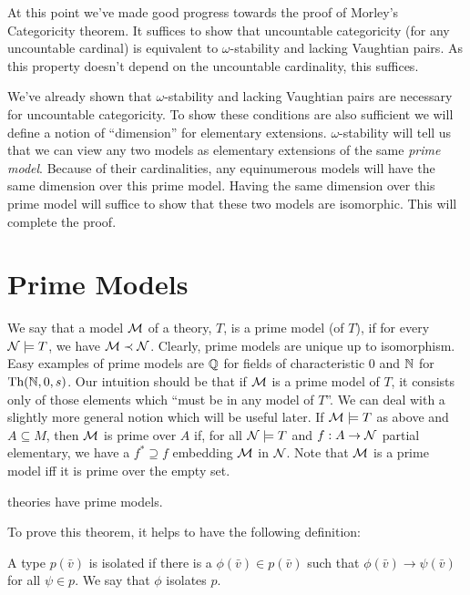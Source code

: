 At this point we've made good progress towards the proof of Morley's Categoricity theorem.
It suffices to show that uncountable categoricity (for any uncountable cardinal) is equivalent to \(\omega\)-stability and lacking Vaughtian pairs.
As this property doesn't depend on the uncountable cardinality, this suffices. 

We've already shown that \(\omega\)-stability and lacking Vaughtian pairs are necessary for uncountable categoricity.
To show these conditions are also sufficient we will define a notion of ``dimension'' for elementary extensions.
\(\omega\)-stability will tell us that we can view any two models as elementary extensions of the same \textit{prime model}.
Because of their cardinalities, any equinumerous models will have the same dimension over this prime model.
Having the same dimension over this prime model will suffice to show that these two models are isomorphic.
This will complete the proof. 

\section{Prime Models}

\begin{definition}\label{definition_prime_model}
We say that a model \(\mathcal{M}\) of a theory, \(T\), is a prime model (of \(T\)), if for every \(\mathcal{N} \models T\), we have \(\mathcal{M} \prec \mathcal{N}\). 
Clearly, prime models are unique up to isomorphism. 
Easy examples of prime models are \(\mathbb{Q}\) for fields of characteristic 0 and \(\mathbb{N}\) for \(\text{Th}(\mathbb{N}, 0, s)\). 
Our intuition should be that if \(\mathcal{M}\) is a prime model of \(T\), it consists only of those elements which ``must be in any model of \(T\)''.
We can deal with a slightly more general notion which will be useful later. 
If \(\mathcal{M} \models T\) as above and \(A \subseteq M\), then \(\mathcal{M}\) is prime over \(A\) if, for all \(\mathcal{N} \models T\) and \(f:A \to \mathcal{N}\) partial elementary, we have a \(f^* \supseteq f\) embedding \(\mathcal{M}\) in \(\mathcal{N}\). 
Note that \(\mathcal{M}\) is a prime model iff it is prime over the empty set. 
\end{definition}


\begin{theorem}\label{thm_omst_prime}
\omst theories have prime models.
\end{theorem}

To prove this theorem, it helps to have the following definition:
\begin{definition}\label{definition_isolated_types}
A type \(p(\bar{v})\) is isolated if there is a \(\phi(\bar{v}) \in p(\bar{v})\) such that \(\phi(\bar{v}) \to \psi(\bar{v})\) for all \(\psi \in p\). We say that \(\phi\) isolates \(p\). 
\end{definition}

